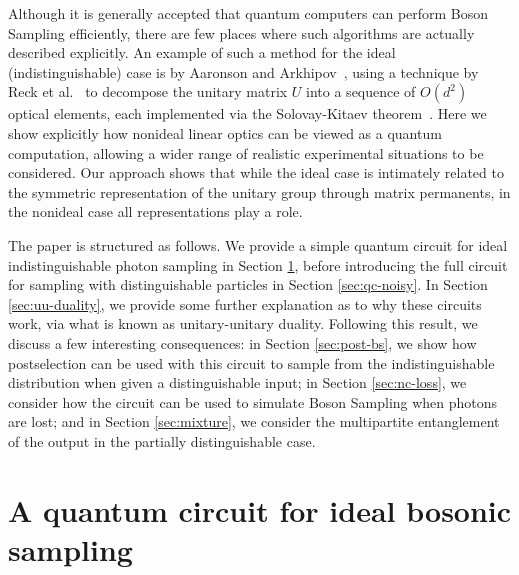Although it is generally accepted that quantum computers can perform Boson Sampling efficiently, there are few places where such algorithms are actually described explicitly. 
An example of such a method for the ideal (indistinguishable) case is by Aaronson and Arkhipov~\cite{aaronson2011}, using a technique by Reck et al.~\cite{reck1994} to decompose the unitary matrix $U$ into a sequence of $O(d^2)$ optical elements, each implemented via the Solovay-Kitaev theorem~\cite{nielsen2010}. 
Here we show explicitly how nonideal linear optics can be viewed as a quantum computation, allowing a wider range of realistic experimental situations to be considered.
Our approach shows that while the ideal case is intimately related to the symmetric representation of the unitary group through matrix permanents, in the nonideal case all representations play a role.

The paper is structured as follows. 
We provide a simple quantum circuit for ideal indistinguishable photon sampling in Section \ref{sec:qc-bs}, before introducing the full circuit for sampling with distinguishable particles in Section \ref{sec:qc-noisy}. 
In Section \ref{sec:uu-duality}, we provide some further explanation as to why these circuits work, via what is known as unitary-unitary duality.
Following this result, we discuss a few interesting consequences: in Section \ref{sec:post-bs}, we show how postselection can be used with this circuit to sample from the indistinguishable distribution when given a distinguishable input; in Section \ref{sec:nc-loss}, we consider how the circuit can be used to simulate Boson Sampling when photons are lost; and in Section \ref{sec:mixture}, we consider the multipartite entanglement of the output in the partially distinguishable case. 

\section{A quantum circuit for ideal bosonic sampling}
\label{sec:qc-bs}

